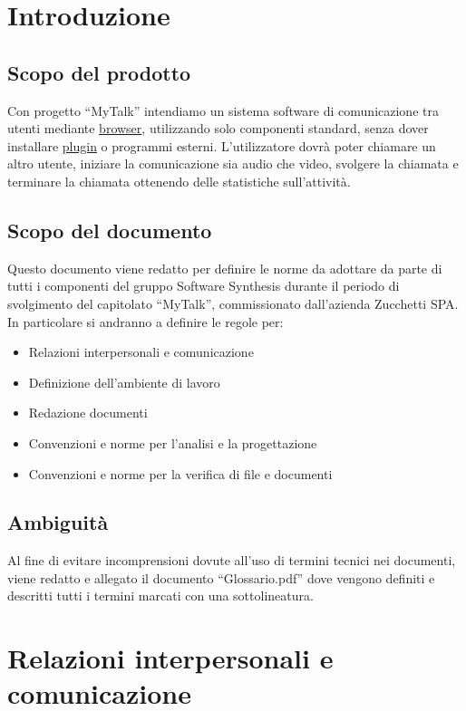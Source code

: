 \newpage
\section{Introduzione}
\subsection{Scopo del prodotto}
Con progetto ``MyTalk'' intendiamo un sistema software di comunicazione tra utenti mediante \underline{browser}, utilizzando solo componenti standard, senza dover installare \underline{plugin} o programmi esterni. L'utilizzatore dovrà poter chiamare un altro utente, iniziare la comunicazione sia audio che video, svolgere la chiamata e terminare la chiamata ottenendo delle statistiche sull'attività.

\subsection{Scopo del documento}
Questo documento viene redatto per definire le norme da adottare da parte di tutti i componenti del gruppo Software Synthesis durante il periodo di svolgimento del capitolato ``MyTalk'', commissionato dall'azienda Zucchetti SPA. In particolare si andranno a definire le regole per:
\begin{itemize}
\item Relazioni interpersonali e comunicazione
\item Definizione dell'ambiente di lavoro
\item Redazione documenti
\item Convenzioni e norme per l'analisi e la progettazione
\item Convenzioni e norme per la verifica di file e documenti
\end{itemize}

\subsection{Ambiguità}
Al fine di evitare incomprensioni dovute all'uso di termini tecnici nei documenti, viene redatto e allegato il documento ``Glossario.pdf'' dove vengono definiti e descritti tutti i termini marcati con una sottolineatura.

\newpage
\section{Relazioni interpersonali e comunicazione}
